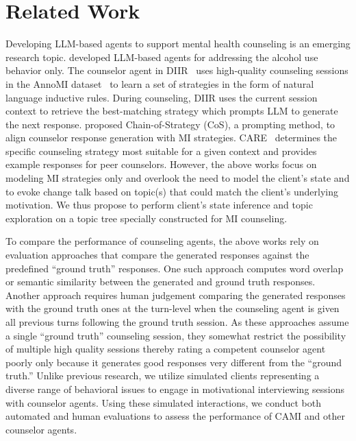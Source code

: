 \section{Related Work}
\label{sec:related}
Developing LLM-based agents to support mental health counseling is an emerging research topic. \citet{steenstra2024virtual} developed LLM-based agents for addressing the alcohol use behavior only. The counselor agent in DIIR~\citep{xie2024few} uses high-quality counseling sessions in the AnnoMI dataset~\citep{wu2022anno,wu2023creation} to learn a set of strategies in the form of natural language inductive rules. During counseling, DIIR uses the current session context to retrieve the best-matching strategy which prompts LLM to generate the next response. 
\citet{sun2024chain} proposed Chain-of-Strategy (CoS), a prompting method, to align counselor response generation with MI strategies. CARE~\citep{hsu2023helping} determines the specific counseling strategy most suitable for a given context and provides example responses for peer counselors. However, the above works focus on modeling MI strategies only and %
overlook the need to model the client's state and to evoke change talk based on topic(s) that could match the client's underlying motivation.  We thus propose to perform client's state inference and topic exploration on a topic tree specially constructed for MI counseling. %

To compare the performance of counseling agents, the above works rely on evaluation approaches that compare the generated responses against the predefined ``ground truth'' responses.  One such approach computes word overlap or semantic similarity between the generated and ground truth responses.  Another approach requires human judgement comparing the generated responses with the ground truth ones at the turn-level when the counseling agent is given all previous turns following the ground truth session. 
As these approaches assume a single ``ground truth'' counseling session, they somewhat restrict the possibility of multiple high quality sessions thereby rating a competent counselor agent poorly only because it generates good responses very different from the ``ground truth.'' Unlike previous research, we utilize simulated clients representing a diverse range of behavioral issues to engage in motivational interviewing sessions with counselor agents. Using these simulated interactions, we conduct both automated and human evaluations to assess the performance of CAMI and other counselor agents.

